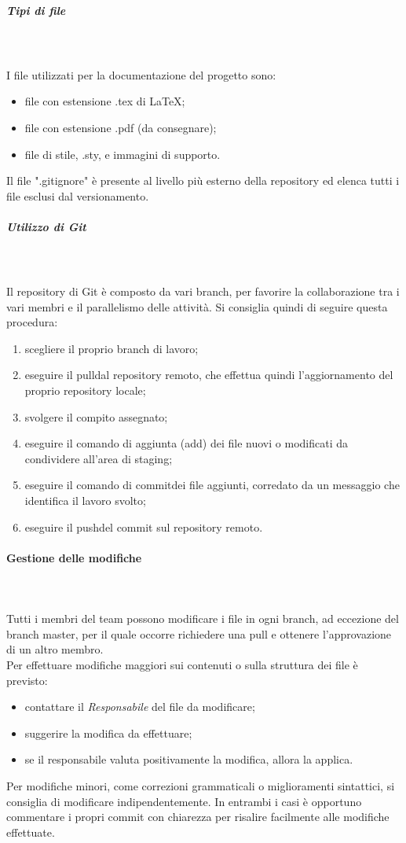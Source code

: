 \subparagraph{Tipi di file} \mbox{} \\ \mbox{} \\
I file utilizzati per la documentazione del progetto sono: \begin{itemize}
\item file con estensione .tex di \LaTeX{};
\item file con estensione .pdf (da consegnare);
\item file di stile, .sty,  e immagini di supporto.
\end{itemize}
Il file ".gitignore" è presente al livello più esterno della repository ed elenca tutti i file esclusi dal versionamento.

\subparagraph{Utilizzo di Git} \mbox{} \\ \mbox{} \\
Il repository di Git è composto da vari branch\glo, per favorire la collaborazione tra i vari membri e il parallelismo delle attività. Si consiglia quindi di seguire questa procedura:
\begin{enumerate}
\item scegliere il proprio branch di lavoro;
\item eseguire il pull\glo dal repository remoto, che effettua quindi l'aggiornamento del proprio repository locale;
\item svolgere il compito assegnato;
\item eseguire il comando di aggiunta (add) dei file nuovi o modificati da condividere all'area di staging\glo;
\item eseguire il comando di commit\glo dei file aggiunti, corredato da un messaggio che identifica il lavoro svolto;
\item eseguire il push\glo del commit sul repository remoto.
\end{enumerate}

\paragraph{Gestione delle modifiche}\mbox{} \\ \mbox{} \\
Tutti i membri del team possono modificare i file in ogni branch, ad eccezione del branch master, per il quale occorre richiedere una pull e ottenere l'approvazione di un altro membro. \\
Per effettuare modifiche maggiori sui contenuti o sulla struttura dei file è previsto: \begin{itemize}
\item contattare il \textit{Responsabile} del file da modificare;
\item suggerire la modifica da effettuare;
\item se il responsabile valuta positivamente la modifica, allora la applica.
\end{itemize}
Per modifiche minori, come correzioni grammaticali o miglioramenti sintattici, si consiglia di modificare indipendentemente. In entrambi i casi è opportuno commentare i propri commit con chiarezza per risalire facilmente alle modifiche effettuate.

